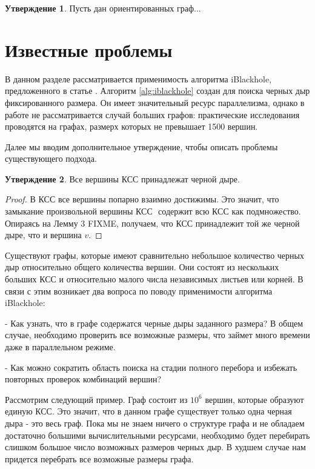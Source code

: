 \documentclass[12pt,a4paper,oneside]{article}
\theoremstyle{definition}
\theoremstyle{lemma}
\newtheorem{lemma}{Утверждение}[]
\theoremstyle{remark}
\begin{document}
\begin{lemma}{}
Пусть дан ориентированных граф...
\end{lemma}

\section{Известные проблемы}\label{sec:knownissues}

В данном разделе рассматривается применимость алгоритма iBlackhole, предложенного в статье \cite{li2010detecting}. Алгоритм \ref{alg:iblackhole} создан для поиска черных дыр фиксированного размера. Он имеет значительный ресурс параллелизма, однако в работе \cite{li2010detecting} не рассматривается случай больших графов: практические исследования проводятся на графах, размерх которых не превышает 1500 вершин. 

Далее мы вводим дополнительное утверждение, чтобы описать проблемы существующего подхода.


\begin{lemma}{}
Все вершины КСС принадлежат черной дыре.
\end{lemma}
\begin{proof}
В КСС все вершины попарно взаимно достижимы. Это значит, что замыкание произвольной вершины КСС $ $ содержит всю КСС как подмножество. Опираясь на Лемму 3 FIXME, получаем, что КСС принадлежит той же черной дыре, что и вершина $v$.
\end{proof}

Существуют графы, которые имеют сравнительно небольшое количество черных дыр относительно общего количества вершин. Они состоят из нескольких больших КСС и относительно малого числа независимых листьев или корней. В связи с этим возникает два вопроса по поводу применимости алгоритма iBlackhole:

    - Как узнать, что в графе содержатся черные дыры заданного размера? В общем случае, необходимо проверить все возможные размеры, что займет много времени даже в параллельном режиме.

    - Как можно сократить область поиска на стадии полного перебора и избежать повторных проверок комбинаций вершин?

Рассмотрим следующий пример. Граф состоит из $10^6$ вершин, которые образуют единую КСС. Это значит, что в данном графе существует только одна черная дыра - это весь граф. Пока мы не знаем ничего о структуре графа и не обладаем достаточно большими вычислительными ресурсами, необходимо будет перебирать слишком большое число возможных размеров черных дыр. В худшем случае нам придется перебрать все возможные размеры графа.
\end{document}
